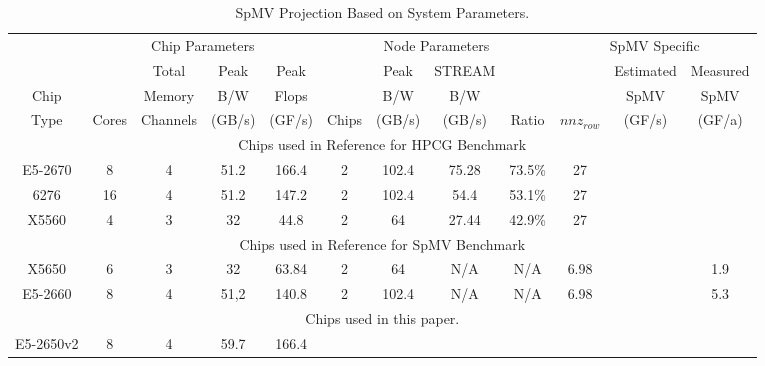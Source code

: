 \begin{table*}\begin{centering}
  \centering
  \begin{tabular}{|c|c|c|c|c|c|c|c|c|c|c|c|}
\hline
&\multicolumn{4}{|c|}{Chip Parameters}&\multicolumn{4}{|c|}{Node Parameters}&\multicolumn{3}{|c|}{SpMV Specific}\\
\cline{2-11}
&&Total&Peak&Peak&&Peak&STREAM&&&Estimated&Measured\\
Chip&&Memory&B/W&Flops&&B/W&B/W&&&SpMV&SpMV\\
Type&Cores&Channels&(GB/s)&(GF/s)&Chips&(GB/s)&(GB/s)&Ratio&$nnz_{row}$&(GF/s)&(GF/a)\\
\hline\hline
\multicolumn{12}{|c|}{Chips used in Reference %
	for HPCG Benchmark}\\ \hline
E5-2670&8&4&51.2&166.4&2&102.4&75.28&73.5\%&27&&\\ \hline
6276&16&4&51.2&147.2&2&102.4&54.4&53.1\%&27&&\\ \hline
X5560&4&3&32&44.8&2&64&27.44&42.9\%&27&&\\ \hline

\multicolumn{12}{|c|}{Chips used in Reference %
	 for SpMV Benchmark}\\ \hline
X5650&6&3&32&63.84&2&64&N/A&N/A&6.98&&1.9 \\ \hline
E5-2660&8&4&51,2&140.8&2&102.4&N/A&N/A&6.98&&5.3 \\ \hline


\multicolumn{12}{|c|}{Chips used in this paper.}\\ \hline
E5-2650v2&8&4&59.7&166.4 \\ \hline
\hline
  \end{tabular}
  \caption{SpMV Projection Based on System Parameters.}
  \label{tab:analytic}
\end{centering}\end{table*}
